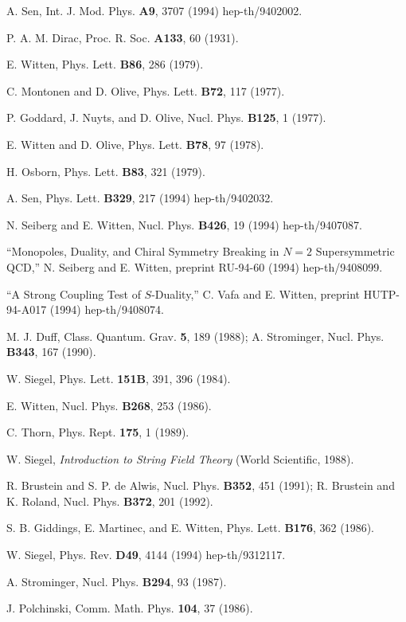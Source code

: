 \begin{thebibliography}{99}
 A. Sen, Int. J. Mod. Phys.
{\bf A9}, 3707 (1994) hep-th/9402002.

 P. A. M. Dirac, Proc. R. Soc. {\bf A133}, 60
(1931).

 E. Witten, Phys. Lett. {\bf B86}, 286 (1979).

 C. Montonen and D. Olive, Phys. Lett. {\bf B72},
117 (1977).

 P. Goddard, J. Nuyts, and D. Olive, Nucl. Phys.
{\bf B125}, 1 (1977).

 E. Witten and D. Olive, Phys. Lett. {\bf B78},
97 (1978).

 H. Osborn, Phys. Lett. {\bf B83}, 321 (1979).

 A. Sen, Phys. Lett. {\bf
B329}, 217 (1994) hep-th/9402032.

 N. Seiberg and E. Witten,
Nucl. Phys. {\bf B426}, 19 (1994) hep-th/9407087.

 ``Monopoles, Duality, and Chiral Symmetry
Breaking in $N=2$ Supersymmetric QCD,''
N. Seiberg and E. Witten, preprint RU-94-60
(1994) hep-th/9408099.

 ``A Strong Coupling Test of $S$-Duality,''
C. Vafa and E. Witten, preprint HUTP-94-A017 (1994)
hep-th/9408074.

 M. J. Duff, Class. Quantum. Grav. {\bf 5}, 189 (1988);
A. Strominger, Nucl. Phys. {\bf B343}, 167 (1990).

 W. Siegel, Phys. Lett. {\bf 151B}, 391, 396
(1984).

 E. Witten, Nucl. Phys. {\bf B268}, 253 (1986).

 C. Thorn, Phys. Rept. {\bf 175}, 1 (1989).

 W. Siegel, {\it Introduction to String Field
Theory} (World Scientific, 1988).
 
 R. Brustein and S. P. de Alwis, Nucl. Phys.
{\bf B352}, 451 (1991);
R. Brustein and K. Roland, Nucl. Phys. {\bf
B372}, 201 (1992).

 S. B. Giddings, E. Martinec, and E. Witten,
Phys. Lett. {\bf B176}, 362 (1986).

 W. Siegel, Phys. Rev. {\bf D49}, 4144 (1994)
hep-th/9312117.

 A. Strominger, Nucl. Phys. {\bf B294}, 93
(1987).  

 J. Polchinski, Comm. Math. Phys. {\bf 104}, 37
(1986).


\end{thebibliography}
